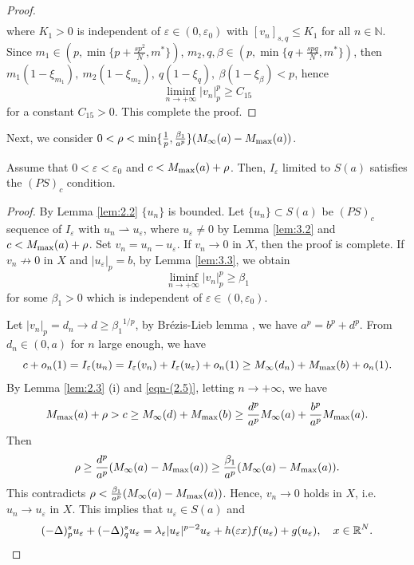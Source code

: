 \documentclass[reqno]{amsart}
\begin{document}
\begin{proof}
\begin{equation}
\begin{aligned}
\end{aligned}
\end{equation}
where $K_1>0$ is independent of $\varepsilon\in(0,\varepsilon_0)$ with 
$[v_n]_{{s,q}}\le K_1$ for all $n\in\mathbb{N}$.
Since $m_1\in(p,\min\{p+\frac{sp^2}{N},m^{*}\})$, 
$m_2, q,\beta\in(p,\min\{q+\frac{spq}{N},m^{*}\})$, then 
$m_1(1-\xi_{m_1}),~m_2(1-\xi_{m_2}),~q(1-\xi_{q}),~\beta(1-\xi_{\beta})<p$,
hence
\begin{equation}\label{eqn-(3.13)}
\liminf_{n\to +\infty} |v_n|_p^{p}\ge C_{15}
\end{equation}
for a constant $C_{15}>0$. This complete the proof.
\end{proof}

Next, we consider 
$0<\rho<\min\{{\frac{1}{p},\frac{\beta_1}{a^{p}}}\}(M_\infty(a)-M_{\rm max}(a))$.

\begin{lemma}\label{lem:3.4} 
Assume that $0<\varepsilon<\varepsilon_0$ and $c<M_{\rm max}(a)+\rho$. 
Then, $I_\varepsilon$ limited to $S(a)$ satisfies the $(PS)_c$ condition.
\end{lemma}

\begin{proof}
By Lemma \ref{lem:2.2} $\{u_n\}$ is bounded.  
Let $\{u_n\}\subset S(a)$ be $(PS)_c$ sequence of $I_\varepsilon$ with 
$u_n\rightharpoonup u_\varepsilon$, where $u_\varepsilon\neq 0$ by Lemma \ref{lem:3.2} 
and $c<M_{\rm max}(a)+\rho$. Set $v_n=u_n- u_\varepsilon$. If $v_n\to0$ in $X$, 
then the proof is complete.
If $v_n\not\to0$ in $X$ and $|u_\varepsilon|_{p}=b$, by Lemma \ref{lem:3.3}, 
we obtain
\begin{equation}\label{eqn-(3.14)}
\liminf_{n\to +\infty} |v_n|_p^{p}\ge \beta_1
\end{equation}
for some $\beta_1>0$ which is independent of $\varepsilon\in(0,\varepsilon_0)$.

Let $|v_n|_p=d_n\to d\ge{\beta_{1}}^{1/p}$, by Br\'ezis-Lieb lemma \cite{ref31},  
we have $a^{p}=b^{p}+d^{p}$. From $d_n\in(0,a)$ for $n$ large enough, we have
$$
c+o_n(1)=I_\varepsilon(u_n)=I_\varepsilon(v_n)+I_\varepsilon(u_\varepsilon)+o_n(1)
\ge M_\infty(d_n)+M_{\rm max}(b)+o_n(1).
$$
By Lemma \ref{lem:2.3} (i) and \eqref{eqn-(2.5)}, letting $n\to+\infty$, we have
$$
M_{\rm max}(a)+\rho>c\ge M_\infty(d)+M_{\rm max}(b)
\ge\frac{d^{p}}{a^{p}}M_\infty(a)+\frac{b^{p}}{a^{p}}M_{\rm max}(a).
$$
Then
$$
\rho\ge\frac{d^{p}}{a^{p}}(M_\infty(a)-M_{\rm max}(a))
\ge\frac{\beta_1}{a^{p}}(M_\infty(a)-M_{\rm max}(a)).
$$
This contradicts $\rho<\frac{\beta_1}{a^{p}}(M_\infty(a)-M_{\rm max}(a))$. 
Hence, $v_n \to 0 $ holds in $X$, i.e.\ $u_n \to u_\varepsilon$ in $X$. 
This implies that $u_\varepsilon \in S(a)$ and
\begin{equation*}
(-\Delta)_p^{s} u_\varepsilon+(-\Delta)_q^{s} u_\varepsilon
=\lambda_\varepsilon |u_\varepsilon|^{p-2}u_\varepsilon+h(\varepsilon x)
f(u_\varepsilon)+g(u_\varepsilon),\quad x\in\mathbb{R}^N. \qedhere
\end{equation*}
\end{proof}
\end{document}
